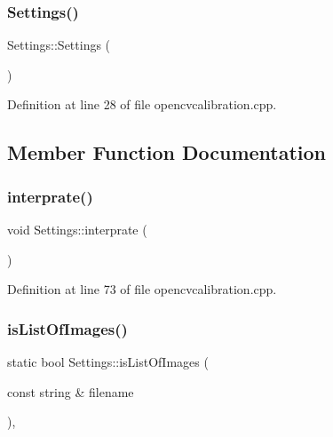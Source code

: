 \subsubsection{\texorpdfstring{Settings()}{Settings()}}
{\footnotesize\ttfamily Settings\+::\+Settings (\begin{DoxyParamCaption}{ }\end{DoxyParamCaption})\hspace{0.3cm}{\ttfamily [inline]}}



Definition at line 28 of file opencvcalibration.\+cpp.



\subsection{Member Function Documentation}
\mbox{\label{class_settings_ac01c17bf3536e296f1076e50cdcb00cd}} 
\subsubsection{\texorpdfstring{interprate()}{interprate()}}
{\footnotesize\ttfamily void Settings\+::interprate (\begin{DoxyParamCaption}{ }\end{DoxyParamCaption})\hspace{0.3cm}{\ttfamily [inline]}}



Definition at line 73 of file opencvcalibration.\+cpp.

\mbox{\label{class_settings_ae7696860215ac20c48a5e7121c5dd32e}} 
\subsubsection{\texorpdfstring{isListOfImages()}{isListOfImages()}}
{\footnotesize\ttfamily static bool Settings\+::is\+List\+Of\+Images (\begin{DoxyParamCaption}\item[{const string \&}]{filename }\end{DoxyParamCaption})\hspace{0.3cm}{\ttfamily [inline]}, {\ttfamily [static]}}



